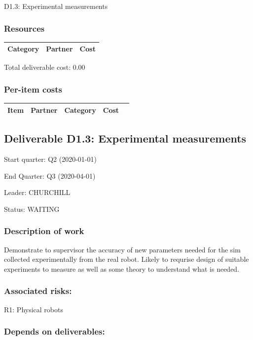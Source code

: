 \documentclass[english]{article}
\begin{document}
D1.3: Experimental measurements



\subsubsection*{Resources}

\begin{tabular}{ | l | l | r | }
\hline
 Category & Partner & Cost \\ 
 \hline
 \hline
 \end{tabular}

Total deliverable cost:  0.00

\subsubsection*{Per-item costs}

\begin{tabular}{ | l | c | c | r | c | }
\hline
 Item & Partner & Category & Cost \\ 
 \hline
 \hline
 \end{tabular}

\newpage\subsection*{Deliverable D1.3: Experimental measurements}

Start quarter: Q2 (2020-01-01) 
 
 End Quarter: Q3 (2020-04-01) 

 Leader: CHURCHILL

  Status: WAITING 

 \subsubsection*{Description of work}

Demonstrate to supervisor the accuracy of new parameters needed for the sim collected experimentally from the real robot. Likely to requrise design of suitable experiments to measure as well as some theory to understand what is needed. 

\subsubsection*{Associated risks:}

R1: Physical robots

\subsubsection*{Depends on deliverables:}
\end{document}
